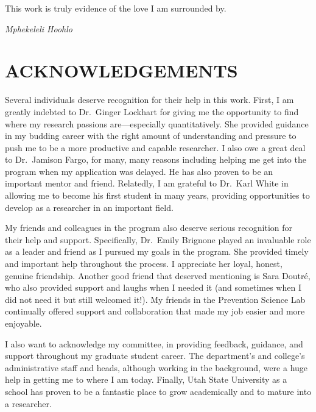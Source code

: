 \documentclass[]{DissertateUSU}
\begin{document}
This work is truly evidence of the love I am surrounded by.

\hspace{10.5 cm} \emph{Mphekeleli Hoohlo}

\newpage

 \fancyhead[R]{\thepage} \fancyfoot[C]{}
\chapter*{ACKNOWLEDGEMENTS}

Several individuals deserve recognition for their help in this work.
First, I am greatly indebted to Dr.~Ginger Lockhart for giving me the
opportunity to find where my research passions are---especially
quantitatively. She provided guidance in my budding career with the
right amount of understanding and pressure to push me to be a more
productive and capable researcher. I also owe a great deal to
Dr.~Jamison Fargo, for many, many reasons including helping me get into
the program when my application was delayed. He has also proven to be an
important mentor and friend. Relatedly, I am grateful to Dr.~Karl White
in allowing me to become his first student in many years, providing
opportunities to develop as a researcher in an important field.

My friends and colleagues in the program also deserve serious
recognition for their help and support. Specifically, Dr.~Emily Brignone
played an invaluable role as a leader and friend as I pursued my goals
in the program. She provided timely and important help throughout the
process. I appreciate her loyal, honest, genuine friendship. Another
good friend that deserved mentioning is Sara Doutré, who also provided
support and laughs when I needed it (and sometimes when I did not need
it but still welcomed it!). My friends in the Prevention Science Lab
continually offered support and collaboration that made my job easier
and more enjoyable.

I also want to acknowledge my committee, in providing feedback,
guidance, and support throughout my graduate student career. The
department's and college's administrative staff and heads, although
working in the background, were a huge help in getting me to where I am
today. Finally, Utah State University as a school has proven to be a
fantastic place to grow academically and to mature into a researcher.

\newpage

 \fancyhead[R]{\thepage} \fancyfoot[C]{}
\tableofcontents
\end{document}
